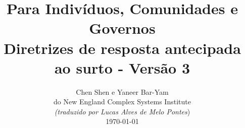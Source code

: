 \documentclass[onecolumn,journal]{IEEEtran}
\begin{document}
\title{\color{Brown}  Para Indivíduos, Comunidades e Governos \\
Diretrizes de resposta antecipada ao surto - Versão 3 \\
\vspace{-0.35ex}}
\author{Chen Shen e Yaneer Bar-Yam \\ do New England Complex Systems Institute \\
\vspace{+0.35ex}
\small{\textit{(traduzido por Lucas Alves de Melo Pontes})}\\
 \today
  \vspace{-8ex} \\
\textbf{}
 }

\maketitle




\thispagestyle{empty} %




\end{document}
